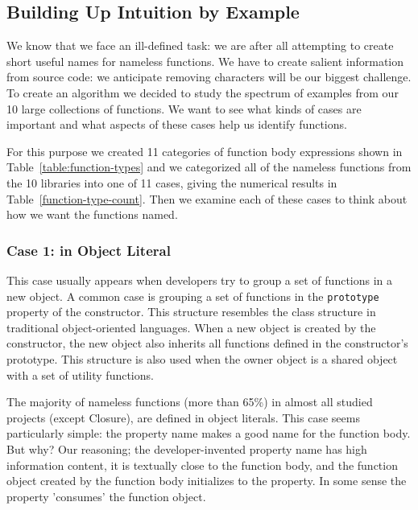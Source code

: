 \documentclass[10pt, preprint]{sigplanconf}
\begin{document}
\subsection{Building Up Intuition by Example}
We know that we face an ill-defined task: we are after all attempting to create short useful names for nameless functions. We have to create salient information from source code: we anticipate removing characters will be our biggest challenge.  To create an algorithm we decided to study the spectrum of examples from our 10 large collections of functions. We want to see what kinds of cases are important and what aspects of these cases help us identify functions.

For this purpose we created 11 categories of function body expressions shown in Table~\ref{table:function-types} and we categorized all of the nameless functions from the 10 libraries into one of 11 cases, giving the numerical results in Table~\ref{function-type-count}.  Then we examine each of these cases to think about how we want the functions named.
  
\subsubsection{Case 1: in Object Literal}
 This case usually appears when developers try to group a set of functions in a new object. A common case is grouping a set of functions in the {\small\texttt{prototype}} property of the constructor. This structure resembles the class structure in traditional object-oriented languages. When a new object is created by the constructor, the new object also inherits all functions defined in the constructor's prototype. This structure is also used  when the owner object is a shared object with a set of utility functions.
 
 The majority of nameless functions (more than 65\%) in almost all studied projects (except Closure), are defined in object literals. This case seems particularly simple: the property name makes a good name for the function body. But why? Our reasoning; the developer-invented property name has high information content, it is textually close to the function body, and the function object created by the function body initializes to the property.  In some sense the property 'consumes' the function object.
 
\end{document}
